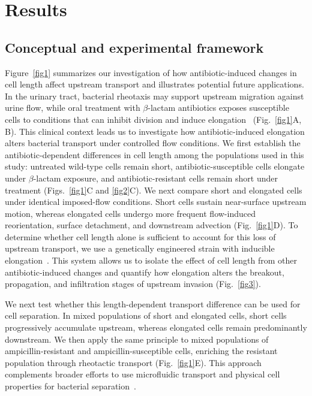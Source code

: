 \documentclass[twoside,twocolumn,9pt]{article}
\begin{document}
\section*{Results}

    \subsection*{Conceptual and experimental framework}
    
    Figure~\ref{fig1} summarizes our investigation of how antibiotic-induced changes in cell length affect upstream transport and illustrates potential future applications. In the urinary tract, bacterial rheotaxis may support upstream migration against urine flow, while oral treatment with $\beta$-lactam antibiotics exposes susceptible cells to conditions that can inhibit division and induce elongation~\cite{Flores-Mireles2015-fq,Siryaporn2015-mm,Kohanski2010-tt,Typas2011-bb,Melnick2023ImpactInfections} (Fig.~\ref{fig1}A, B). This clinical context leads us to investigate how antibiotic-induced elongation alters bacterial transport under controlled flow conditions. We first establish the antibiotic-dependent differences in cell length among the populations used in this study: untreated wild-type cells remain short, antibiotic-susceptible cells elongate under $\beta$-lactam exposure, and antibiotic-resistant cells remain short under treatment (Figs.~\ref{fig1}C and \ref{fig2}C). We next compare short and elongated cells under identical imposed-flow conditions. Short cells sustain near-surface upstream motion, whereas elongated cells undergo more frequent flow-induced reorientation, surface detachment, and downstream advection (Fig.~\ref{fig1}D). To determine whether cell length alone is sufficient to account for this loss of upstream transport, we use a genetically engineered strain with inducible elongation~\cite{Gao2026-vq}. This system allows us to isolate the effect of cell length from other antibiotic-induced changes and quantify how elongation alters the breakout, propagation, and infiltration stages of upstream invasion (Fig.~\ref{fig3}).

    We next test whether this length-dependent transport difference can be used for cell separation. In mixed populations of short and elongated cells, short cells progressively accumulate upstream, whereas elongated cells remain predominantly downstream. We then apply the same principle to mixed populations of ampicillin-resistant and ampicillin-susceptible cells, enriching the resistant population through rheotactic transport (Fig.~\ref{fig1}E). This approach complements broader efforts to use microfluidic transport and physical cell properties for bacterial separation~\cite{Liu2022-uv,Masaeli2012-pq,Tang2022-da,Cruz2019-yx,Zhang2023-ww}.
    
\end{document}
